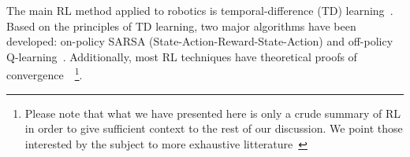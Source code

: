 





    The main RL method applied to robotics is temporal-difference (TD) learning~\parencite{Sutton1988, Bradtke1996}. Based on the principles of TD learning, two major algorithms have been developed: on-policy SARSA (State-Action-Reward-State-Action) and off-policy Q-learning~\parencite{Watkins1989}. Additionally, most RL techniques have theoretical proofs of convergence~\parencite{Panait2005}~\footnote{Please note that what we have presented here is only a crude summary of RL in order to give sufficient context to the rest of our discussion. We point those interested by the subject to more exhaustive litterature~\parencite{Sutton1998, Deisenroth2011}}.


